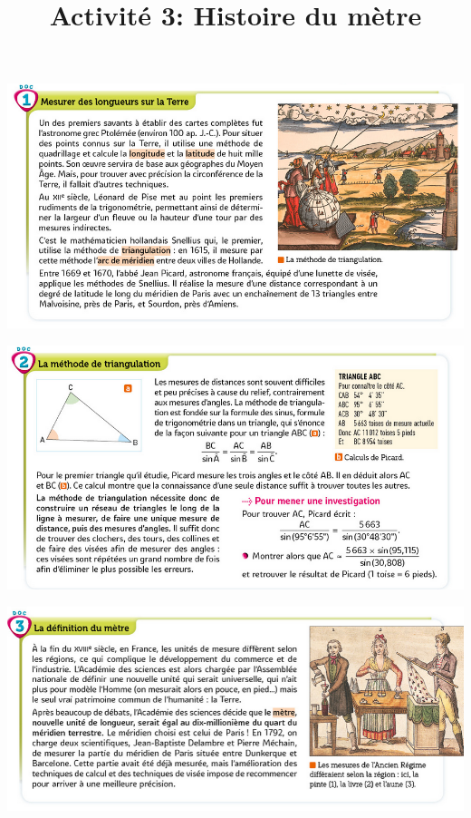 \documentclass[10pt]{article}
\newcommand{\titreActivite}{Activité 3: Histoire du mètre} %
\newcommand{\myscale}{0.57}
\begin{document}
\date{}
\title{\titreActivite}
\maketitle %


\begin{center}
	\includegraphics[scale=\myscale]{assets/d1.png}

	\includegraphics[scale=\myscale]{assets/d2.png}

	\includegraphics[scale=\myscale]{assets/d3.png}


\end{center}
\end{document}

